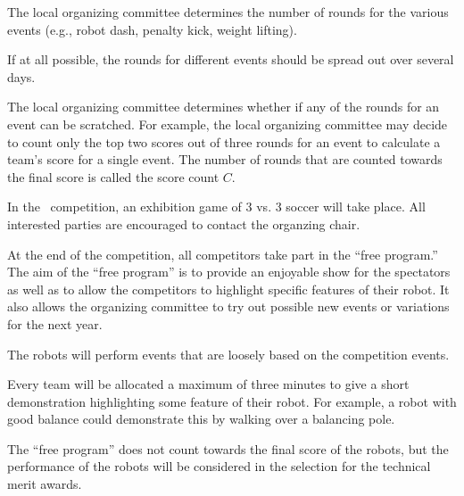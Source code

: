 \documentclass[12pt]{hurocup}
\begin{document}
\begin{lawlist}[ORG]
  
\item The local organizing committee determines the number of rounds
 for the various events (e.g., robot dash, penalty kick, weight lifting).
  
\item If at all possible, the rounds for different events should be spread out  over several days.
 
\item The local organizing committee determines whether if any of the rounds 
 for an event can be scratched. For example, the local organizing
 committee may decide to count only the top two scores out of three
 rounds for an event to calculate a team's score for a single
 event. The number of rounds that are counted towards the final score
 is called the score count $C$.

\end{lawlist}

\begin{decisions}

\item In the \thisyear\ competition, an exhibition game of 3 vs. 3
  soccer will take place. All interested parties are encouraged to
  contact the organzing chair.
\end{decisions}


\begin{lawlist}[ORG]
  
\item At the end of the competition, all competitors take part in the
 ``free program.'' The aim of the ``free program'' is to provide an
 enjoyable show for the spectators as well as to allow the competitors
 to highlight specific features of their robot. It also allows the
 organizing committee to try out possible new events or variations for
 the next year.
  
\item The robots will perform events that are loosely based on the
 competition events. 
  
\item Every team will be allocated a maximum of three minutes to give
 a short demonstration highlighting some feature of their robot. For
 example, a robot with good balance could demonstrate this by walking
 over a balancing pole.
  
\item The ``free program'' does not count towards the final score of
 the robots, but the performance of the robots will be considered in
 the selection for the technical merit awards.

\end{lawlist}
\end{document}
